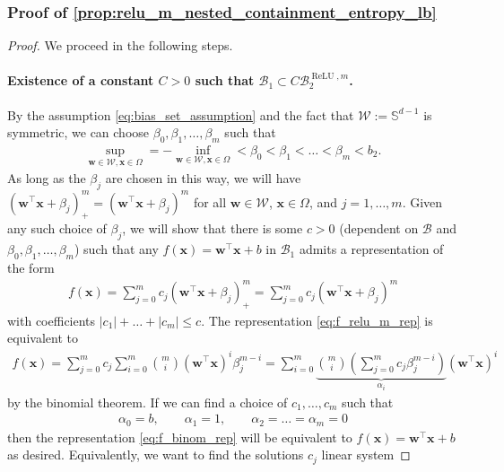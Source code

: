 \documentclass{article}
\DeclareMathOperator{\ReLU}{\mathrm{ReLU}}
\def\vw{{\bm{w}}}
\def\vx{{\bm{x}}}
\def\cB{{\mathcal{B}}}
\def\cW{{\mathcal{W}}}
\def\bS{{\mathbb{S}}}
\begin{document}
\begin{appendices}
    \subsubsection{Proof of \cref{prop:relu_m_nested_containment_entropy_lb}}
\label{appendix:proof_relu_m_nested_containment_entropy_lb}
\begin{proof}
    We proceed in the following steps.
    \paragraph{Existence of a constant $C > 0$ such that $\cB_1 \subset C \cB_2^{\ReLU,m}$.} By the assumption \eqref{eq:bias_set_assumption} and the fact that $\cW := \bS^{d-1}$ is symmetric, we can choose $\beta_0, \beta_1, \dots, \beta_m$ such that 
    \begin{align}
        \sup_{\vw \in \cW, \vx \in \Omega} = - \inf_{\vw \in \cW, \vx \in \Omega} < \beta_0 < \beta_1 < \dots < \beta_m < b_2. 
    \end{align}
    As long as the $\beta_j$ are chosen in this way, we will have $(\vw^\top \vx + \beta_j)_+^m = (\vw^\top \vx + \beta_j)^m$ for all $\vw \in \cW$, $\vx \in \Omega$, and $j = 1, \dots, m$. Given any such choice of $\beta_j$, we will show that there is some $c > 0$ (dependent on $\cB$ and $\beta_0, \beta_1, \dots, \beta_m$) such that any $f(\vx) = \vw^\top \vx + b$ in $\cB_1$ admits a representation of the form
    \begin{align} \label{eq:f_relu_m_rep}
        f(\vx) = \sum_{j=0}^m c_j (\vw^\top \vx + \beta_j)_+^m = \sum_{j=0}^m c_j (\vw^\top \vx + \beta_j)^m
    \end{align}
    with coefficients $|c_1| + \dots + |c_m| \leq c$. The representation \eqref{eq:f_relu_m_rep} is equivalent to
    \begin{align} \label{eq:f_binom_rep}
        f(\vx) = \sum_{j=0}^m c_j \sum_{i=0}^m {m \choose i} (\vw^\top \vx)^i \beta_j^{m-i} = \sum_{i=0}^m \underbrace{{m \choose i} \left( \sum_{j=0}^m c_j \beta_j^{m-i} \right)}_{\alpha_i} (\vw^\top \vx)^i
    \end{align}
    by the binomial theorem. If we can find a choice of $c_1, \dots, c_m$ such that
    \begin{align}
        \alpha_0 = b, \qquad \alpha_1 = 1, \qquad \alpha_2 = \dots = \alpha_m = 0
    \end{align}
    then the representation \eqref{eq:f_binom_rep} will be equivalent to $f(\vx) = \vw^\top \vx + b$ as desired. Equivalently, we want to find the solutions $c_j$ linear system

\end{proof}
\end{appendices}
\end{document}
